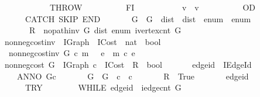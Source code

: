 \begin{isabellebody}
\ \ \ \ \ \ \ \ \ \ \ \ THROW\isanewline
\ \ \ \ \ \ \ \ \ \ FI\ {\isacharsemicolon}{\isacharsemicolon}\isanewline
\ \ \ \ \ \ \ \ \ \ {\isasymacute}v\ {\isacharcolon}{\isacharequal}{\isacharequal}\ {\isasymacute}v\ {\isacharplus}\ {}\isanewline
\ \ \ \ \ \ \ \ OD\isanewline
\ \ \ \ \ \ CATCH\ SKIP\ END\isanewline
\ \ \ \ \ \ {\isasymlbrace}\ {\isasymacute}G\ {\isacharequal}\ G\ {\isasymand}\ {\isasymacute}dist\ {\isacharequal}\ dist\ {\isasymand}\ {\isasymacute}enum\ {\isacharequal}\ enum\isanewline
\ \ \ \ \ \ {\isasymand}\ {\isasymacute}R\ {\isacharequal}\ no{\isacharunderscore}path{\isacharunderscore}inv\ {\isasymacute}G\ {\isasymacute}dist\ {\isasymacute}enum\ {\isacharparenleft}ivertex{\isacharunderscore}cnt\ {\isasymacute}G{\isacharparenright}\ {\isasymrbrace}\isanewline
\ \ \ \ {\isachardoublequoteclose}\isanewline
\isanewline
{}\isamarkupfalse%
\ non{\isacharunderscore}neg{\isacharunderscore}cost{\isacharunderscore}inv\ {\isacharcolon}{\isacharcolon}\ {\isachardoublequoteopen}IGraph\ {\isasymRightarrow}\ ICost\ {\isasymRightarrow}\ nat\ {\isasymRightarrow}\ bool{\isachardoublequoteclose}\ \isanewline
\ \ {\isachardoublequoteopen}non{\isacharunderscore}neg{\isacharunderscore}cost{\isacharunderscore}inv\ G\ c\ m\ {\isasymequiv}\ \ {\isasymforall}e\ {\isacharless}\ m{\isachardot}\ c\ e\ {\isasymge}\ {}{\isachardoublequoteclose}\isanewline
\isanewline
{}\isamarkupfalse%
\ non{\isacharunderscore}neg{\isacharunderscore}cost\ {\isacharparenleft}G\ {\isacharcolon}{\isacharcolon}\ IGraph{\isacharcomma}\ c\ {\isacharcolon}{\isacharcolon}\ ICost\ {\isacharbar}\ R\ {\isacharcolon}{\isacharcolon}\ bool{\isacharparenright}\isanewline
\ \ \isanewline
\ \ \ \ edge{\isacharunderscore}id\ {\isacharcolon}{\isacharcolon}\ IEdge{\isacharunderscore}Id\isanewline
\ \ \ {\isachardoublequoteopen}\isanewline
\ \ \ \ ANNO\ {\isacharparenleft}G{\isacharcomma}c{\isacharparenright}{\isachardot}\isanewline
\ \ \ \ \ \ {\isasymlbrace}\ {\isasymacute}G\ {\isacharequal}\ G\ {\isasymand}\ {\isasymacute}c\ {\isacharequal}\ c\ {\isasymrbrace}\isanewline
\ \ \ \ \ \ {\isasymacute}R\ {\isacharcolon}{\isacharequal}{\isacharequal}\ True\ {\isacharsemicolon}{\isacharsemicolon}\isanewline
\ \ \ \ \ \ {\isasymacute}edge{\isacharunderscore}id\ {\isacharcolon}{\isacharequal}{\isacharequal}\ {}\ {\isacharsemicolon}{\isacharsemicolon}\isanewline
\ \ \ \ \ \ TRY\isanewline
\ \ \ \ \ \ \ \ WHILE\ {\isasymacute}edge{\isacharunderscore}id\ {\isacharless}\ iedge{\isacharunderscore}cnt\ {\isasymacute}G\isanewline

\end{isabellebody}
